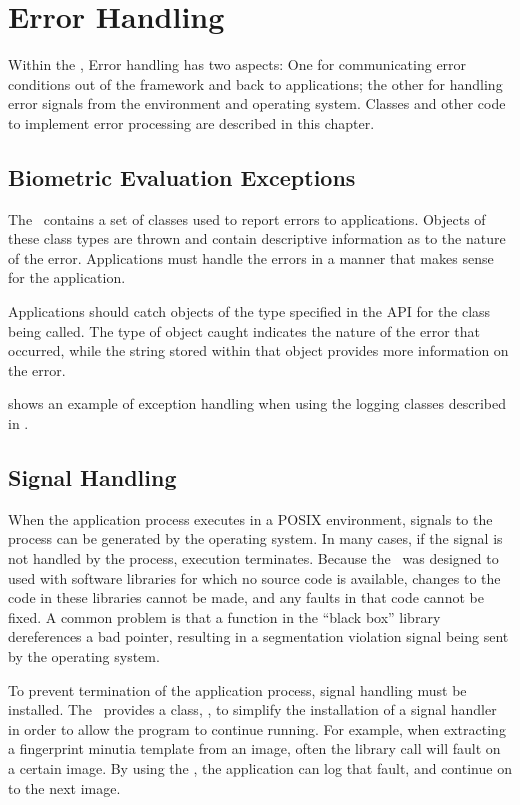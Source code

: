 %
%
\chapter{Error Handling}
\label{chp-error}

Within the \lname, Error handling has two aspects: One for communicating
error conditions out of the framework and back to applications; the other for
handling error signals from the environment and operating system. Classes
and other code to implement error processing are described in this chapter.

\section{Biometric Evaluation Exceptions}
The \lname\ contains a set of classes used to report errors to applications.
Objects of these class types are thrown and contain descriptive information as
to the nature of the error. Applications must handle the errors in a manner
that makes sense for the application.

Applications should catch objects of the type specified in the API for the
class being called. The type of object caught indicates the nature of the
error that occurred, while the string stored within that object
provides more information on the error.

 shows an example of exception handling when using
the logging classes described in .

\section{Signal Handling}
\label{sec-signalhandling}

When the application process executes in a POSIX environment, signals to the
process can be generated by the operating system. In many cases, if the
signal is not handled by the process, execution terminates. Because the
\lname\ was designed to used with software libraries for which no source code
is available, changes to the code in these libraries cannot be made, and any
faults in that code cannot be fixed. A common problem is that a function in
the ``black box'' library dereferences a bad pointer, resulting in a
segmentation violation signal being sent by the operating system.

To prevent termination of the application process, signal handling must be
installed. The \lname\ provides a class, , to simplify
the installation of a signal handler in order to allow the program to
continue running. For example, when extracting a fingerprint minutia template
from an image, often the library call will fault on a certain image. By using
the , the application can log that fault, and continue on
to the next image.

